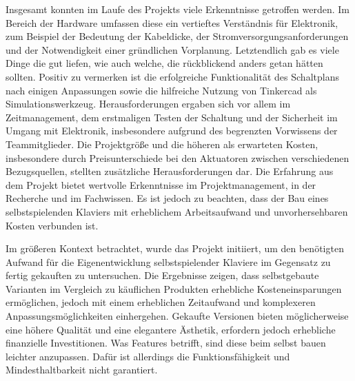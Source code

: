 Insgesamt konnten im Laufe des Projekts viele Erkenntnisse getroffen werden.
Im Bereich der Hardware umfassen diese ein vertieftes Verständnis für Elektronik, zum Beispiel der Bedeutung der Kabeldicke, der Stromversorgungsanforderungen und der Notwendigkeit einer gründlichen Vorplanung. %
Letztendlich gab es viele Dinge die gut liefen, wie auch welche, die rückblickend anders getan hätten sollten.
Positiv zu vermerken ist die erfolgreiche Funktionalität des Schaltplans nach einigen Anpassungen sowie die hilfreiche Nutzung von Tinkercad als Simulationswerkzeug.
Herausforderungen ergaben sich vor allem im Zeitmanagement, dem erstmaligen Testen der Schaltung und der Sicherheit im Umgang mit Elektronik, insbesondere aufgrund des begrenzten Vorwissens der Teammitglieder. %
Die Projektgröße und die höheren als erwarteten Kosten, insbesondere durch Preisunterschiede bei den Aktuatoren zwischen verschiedenen Bezugsquellen, stellten zusätzliche Herausforderungen dar. %
Die Erfahrung aus dem Projekt bietet wertvolle Erkenntnisse im Projektmanagement, in der Recherche und im Fachwissen.
Es ist jedoch zu beachten, dass der Bau eines selbstspielenden Klaviers mit erheblichem Arbeitsaufwand und unvorhersehbaren Kosten verbunden ist.

Im größeren Kontext betrachtet, wurde das Projekt initiiert, um den benötigten Aufwand für die Eigenentwicklung selbstspielender Klaviere im Gegensatz zu fertig gekauften zu untersuchen.
Die Ergebnisse zeigen, dass selbstgebaute Varianten im Vergleich zu käuflichen Produkten erhebliche Kosteneinsparungen ermöglichen, jedoch mit einem erheblichen Zeitaufwand und komplexeren Anpassungsmöglichkeiten einhergehen.
Gekaufte Versionen bieten möglicherweise eine höhere Qualität und eine elegantere Ästhetik, erfordern jedoch erhebliche finanzielle Investitionen.
Was Features betrifft, sind diese beim selbst bauen leichter anzupassen.
Dafür ist allerdings die Funktionsfähigkeit und  Mindesthaltbarkeit nicht garantiert.

